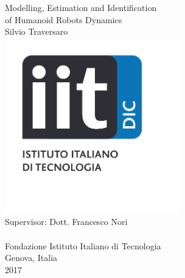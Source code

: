 
\thispagestyle{empty}

\begin{titlepage}
\centering
{}
\null
\vspace*{0.25in}
\huge
Modelling, Estimation and Identification \\ of Humanoid Robots Dynamics \\
\normalfont\large
\Large
\vspace{2em}
Silvio Traversaro
\\
\includegraphics[height=3in]
{./Figs/iit_dic}
\\
Supervisor: Dott. Francesco Nori
\\
\hspace{1em}
\\
Fondazione Istituto Italiano di Tecnologia
\\
Genova, Italia
\\
2017
\\
\par
\end{titlepage}